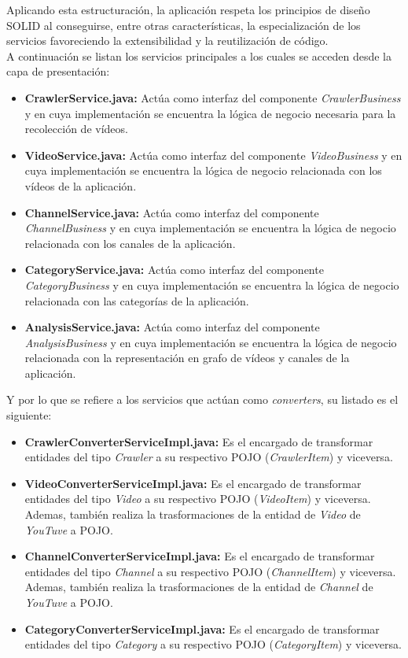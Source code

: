 \documentclass[11pt,a4paper]{article}
\begin{document}
Aplicando esta estructuración, la aplicación respeta los principios de diseño SOLID \cite{44} al conseguirse, entre otras características,  la especialización de los servicios favoreciendo la extensibilidad y la reutilización de código. 
\\

A continuación se listan los servicios principales a los cuales se acceden desde la capa de presentación:
\begin{itemize}
\item \textbf{CrawlerService.java:} Actúa como interfaz del componente \textit{CrawlerBusiness} y en cuya implementación se encuentra la lógica de negocio necesaria para la recolección de vídeos.
\item \textbf{VideoService.java:} Actúa como interfaz del componente \textit{VideoBusiness} y en cuya implementación se encuentra la lógica de negocio relacionada con los vídeos de la aplicación.
\item \textbf{ChannelService.java:} Actúa como interfaz del componente \textit{ChannelBusiness} y en cuya implementación se encuentra la lógica de negocio relacionada con los canales de la aplicación.
\item \textbf{CategoryService.java:} Actúa como interfaz del componente \textit{CategoryBusiness} y en cuya implementación se encuentra la lógica de negocio relacionada con las categorías de la aplicación.
\item \textbf{AnalysisService.java:} Actúa como interfaz del componente \textit{AnalysisBusiness} y en cuya implementación se encuentra la lógica de negocio relacionada con la representación en grafo de vídeos y canales de la aplicación.
\end{itemize}

Y por lo que se refiere a los servicios que actúan como \textit{converters}, su listado es el siguiente:
\begin{itemize}
\item \textbf{CrawlerConverterServiceImpl.java:} Es el encargado de transformar entidades del tipo \textit{Crawler} a su respectivo POJO (\textit{CrawlerItem}) y viceversa.
\item \textbf{VideoConverterServiceImpl.java:} Es el encargado de transformar entidades del tipo \textit{Video} a su respectivo POJO (\textit{VideoItem}) y viceversa. Ademas, también realiza la trasformaciones de la entidad de \textit{Video} de \textit{YouTuve} a POJO.
\item \textbf{ChannelConverterServiceImpl.java:} Es el encargado de transformar entidades del tipo \textit{Channel} a su respectivo POJO (\textit{ChannelItem}) y viceversa. Ademas, también realiza la trasformaciones de la entidad de \textit{Channel} de \textit{YouTuve} a POJO.
\item \textbf{CategoryConverterServiceImpl.java:} Es el encargado de transformar entidades del tipo \textit{Category} a su respectivo POJO (\textit{CategoryItem}) y viceversa.
\end{itemize}
\end{document}
